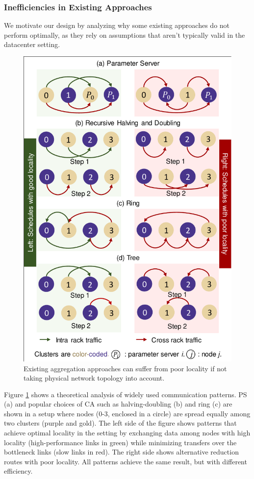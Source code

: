 \subsubsection{Inefficiencies in Existing Approaches}
\label{sec:differentReductionAlgorithms}
We motivate our design by analyzing why some existing approaches do not perform optimally, as they rely on assumptions that aren't typically valid in the datacenter setting. 


\begin{figure}[t!]
	\centering
	\includegraphics[width=.5\linewidth, trim=3 3 3 3,clip]{Figures/poorlocalitywithexistingapproach.pdf}
	\caption{Existing aggregation approaches can suffer from poor locality if not taking physical network topology into account.} %
	\label{fig:poorlocalitywithexistingapproach}
\end{figure}

Figure \ref{fig:poorlocalitywithexistingapproach} shows a theoretical analysis of widely used communication patterns. PS (a) and popular choices of CA such as halving-doubling (b) and ring (c) are shown in a setup where nodes (0-3, enclosed in a circle) are spread equally among two clusters (purple and gold).  The left side of the figure shows patterns that achieve optimal locality in the setting by exchanging data among nodes with high locality (high-performance links in green) while minimizing transfers over the bottleneck links (slow links in red). The right side shows alternative reduction routes with poor locality. All patterns achieve the same result, but with different efficiency.

